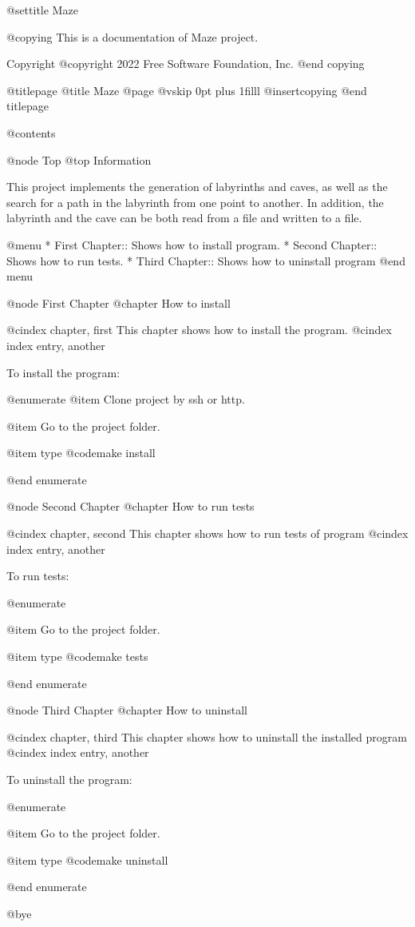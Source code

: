 
@settitle Maze

@copying
This is a documentation of Maze project.

Copyright @copyright{} 2022 Free Software Foundation, Inc.
@end copying

@titlepage
@title Maze
@page
@vskip 0pt plus 1filll
@insertcopying
@end titlepage

@contents

@node Top
@top Information

This project implements the generation of labyrinths and caves, as well as the search for a path in the labyrinth from one point to another. In addition, the labyrinth and the cave can be both read from a file and written to a file.

@menu
* First Chapter::    Shows how to install program.
* Second Chapter::    Shows how to run tests.
* Third Chapter::   Shows how to uninstall program
@end menu

@node First Chapter
@chapter How to install

@cindex chapter, first
This chapter shows how to install the program.
@cindex index entry, another

To install the program:

@enumerate
@item
Clone project by ssh or http.

@item
Go to the project folder.

@item
type @code{make install}

@end enumerate

@node Second Chapter
@chapter How to run tests

@cindex chapter, second
This chapter shows how to run tests of  program
@cindex index entry, another

To run tests:

@enumerate

@item
Go to the project folder.

@item
type @code{make tests}

@end enumerate

@node Third Chapter
@chapter How to uninstall

@cindex chapter, third
This chapter shows how to uninstall the installed program
@cindex index entry, another

To uninstall the program:

@enumerate

@item
Go to the project folder.

@item
type @code{make uninstall}

@end enumerate

@bye
